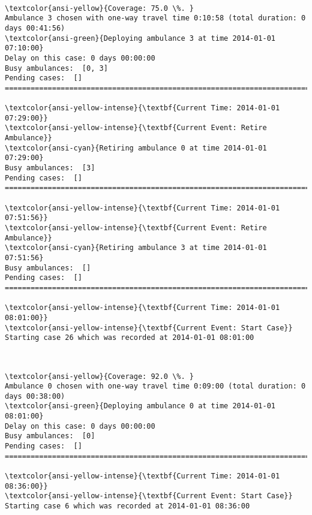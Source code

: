 \documentclass[11pt]{article}
\begin{document}
    \begin{center}
    \end{center}
    { \hspace*{\fill} \\}
    
    \begin{Verbatim}[commandchars=\\\{\}]
\textcolor{ansi-yellow}{Coverage: 75.0 \%. }
Ambulance 3 chosen with one-way travel time 0:10:58 (total duration: 0 days 00:41:56)
\textcolor{ansi-green}{Deploying ambulance 3 at time 2014-01-01 07:10:00}
Delay on this case: 0 days 00:00:00
Busy ambulances:  [0, 3]
Pending cases:  []
========================================================================

\textcolor{ansi-yellow-intense}{\textbf{Current Time: 2014-01-01 07:29:00}}
\textcolor{ansi-yellow-intense}{\textbf{Current Event: Retire Ambulance}}
\textcolor{ansi-cyan}{Retiring ambulance 0 at time 2014-01-01 07:29:00}
Busy ambulances:  [3]
Pending cases:  []
========================================================================

\textcolor{ansi-yellow-intense}{\textbf{Current Time: 2014-01-01 07:51:56}}
\textcolor{ansi-yellow-intense}{\textbf{Current Event: Retire Ambulance}}
\textcolor{ansi-cyan}{Retiring ambulance 3 at time 2014-01-01 07:51:56}
Busy ambulances:  []
Pending cases:  []
========================================================================

\textcolor{ansi-yellow-intense}{\textbf{Current Time: 2014-01-01 08:01:00}}
\textcolor{ansi-yellow-intense}{\textbf{Current Event: Start Case}}
Starting case 26 which was recorded at 2014-01-01 08:01:00

    \end{Verbatim}

    \begin{center}
    \end{center}
    { \hspace*{\fill} \\}
    
    \begin{Verbatim}[commandchars=\\\{\}]
\textcolor{ansi-yellow}{Coverage: 92.0 \%. }
Ambulance 0 chosen with one-way travel time 0:09:00 (total duration: 0 days 00:38:00)
\textcolor{ansi-green}{Deploying ambulance 0 at time 2014-01-01 08:01:00}
Delay on this case: 0 days 00:00:00
Busy ambulances:  [0]
Pending cases:  []
========================================================================

\textcolor{ansi-yellow-intense}{\textbf{Current Time: 2014-01-01 08:36:00}}
\textcolor{ansi-yellow-intense}{\textbf{Current Event: Start Case}}
Starting case 6 which was recorded at 2014-01-01 08:36:00

    \end{Verbatim}
\end{document}
